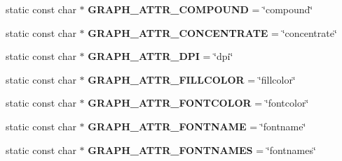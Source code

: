 \begin{DoxyCompactItemize}
\item 
static const char $\ast$ {\bfseries G\+R\+A\+P\+H\+\_\+\+A\+T\+T\+R\+\_\+\+C\+O\+M\+P\+O\+U\+ND} = \char`\"{}compound\char`\"{}\hypertarget{classmemgraph_1_1_graphviz_attrs_af91536cddfa8cc6928cffce9f7e8c380}{}\label{classmemgraph_1_1_graphviz_attrs_af91536cddfa8cc6928cffce9f7e8c380}

\item 
static const char $\ast$ {\bfseries G\+R\+A\+P\+H\+\_\+\+A\+T\+T\+R\+\_\+\+C\+O\+N\+C\+E\+N\+T\+R\+A\+TE} = \char`\"{}concentrate\char`\"{}\hypertarget{classmemgraph_1_1_graphviz_attrs_a775a91602084da3088489981c44b993e}{}\label{classmemgraph_1_1_graphviz_attrs_a775a91602084da3088489981c44b993e}

\item 
static const char $\ast$ {\bfseries G\+R\+A\+P\+H\+\_\+\+A\+T\+T\+R\+\_\+\+D\+PI} = \char`\"{}dpi\char`\"{}\hypertarget{classmemgraph_1_1_graphviz_attrs_afc5782c04dfc5ec3c64ab8cc77e7a417}{}\label{classmemgraph_1_1_graphviz_attrs_afc5782c04dfc5ec3c64ab8cc77e7a417}

\item 
static const char $\ast$ {\bfseries G\+R\+A\+P\+H\+\_\+\+A\+T\+T\+R\+\_\+\+F\+I\+L\+L\+C\+O\+L\+OR} = \char`\"{}fillcolor\char`\"{}\hypertarget{classmemgraph_1_1_graphviz_attrs_a9ed2f80d1b73d628228dc9c563bca629}{}\label{classmemgraph_1_1_graphviz_attrs_a9ed2f80d1b73d628228dc9c563bca629}

\item 
static const char $\ast$ {\bfseries G\+R\+A\+P\+H\+\_\+\+A\+T\+T\+R\+\_\+\+F\+O\+N\+T\+C\+O\+L\+OR} = \char`\"{}fontcolor\char`\"{}\hypertarget{classmemgraph_1_1_graphviz_attrs_a342f58ed8ff5f480bbb4260a24918409}{}\label{classmemgraph_1_1_graphviz_attrs_a342f58ed8ff5f480bbb4260a24918409}

\item 
static const char $\ast$ {\bfseries G\+R\+A\+P\+H\+\_\+\+A\+T\+T\+R\+\_\+\+F\+O\+N\+T\+N\+A\+ME} = \char`\"{}fontname\char`\"{}\hypertarget{classmemgraph_1_1_graphviz_attrs_a0ed1b9156a4503602d943dce794350a9}{}\label{classmemgraph_1_1_graphviz_attrs_a0ed1b9156a4503602d943dce794350a9}

\item 
static const char $\ast$ {\bfseries G\+R\+A\+P\+H\+\_\+\+A\+T\+T\+R\+\_\+\+F\+O\+N\+T\+N\+A\+M\+ES} = \char`\"{}fontnames\char`\"{}\hypertarget{classmemgraph_1_1_graphviz_attrs_aaa56975d71a549be288cca3dd96ff4b6}{}\label{classmemgraph_1_1_graphviz_attrs_aaa56975d71a549be288cca3dd96ff4b6}


\end{DoxyCompactItemize}

